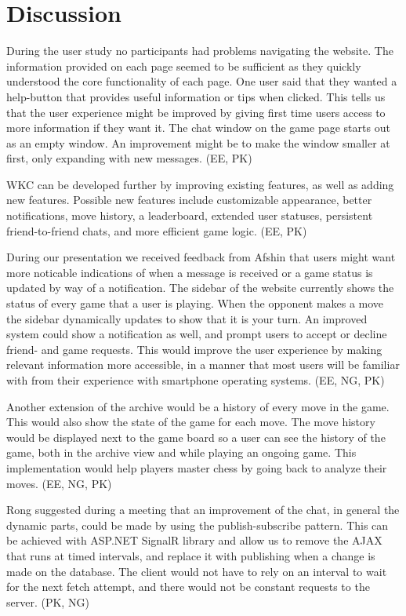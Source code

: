 \documentclass[acmlarge, review=false, screen=true]{acmart}
\begin{document}
\section{Discussion}
  During the user study no participants had problems navigating the website. The information provided on each page seemed to be sufficient as they quickly understood the core functionality of each page. One user said that they wanted a help-button that provides useful information or tips when clicked. This tells us that the user experience might be improved by giving first time users access to more information if they want it. The chat window on the game page starts out as an empty window. An improvement might be to make the window smaller at first, only expanding with new messages. (EE, PK)

  WKC can be developed further by improving existing features, as well as adding new features. Possible new features include customizable appearance, better notifications, move history, a leaderboard, extended user statuses, persistent friend-to-friend chats, and more efficient game logic. (EE, PK)

  During our presentation we received feedback from Afshin that users might want more noticable indications of when a message is received or a game status is updated by way of a notification. The sidebar of the website currently shows the status of every game that a user is playing. When the opponent makes a move the sidebar dynamically updates to show that it is your turn. An improved system could show a notification as well, and prompt users to accept or decline friend- and game requests. This would improve the user experience by making relevant information more accessible, in a manner that most users will be familiar with from their experience with smartphone operating systems. (EE, NG, PK)

  Another extension of the archive would be a history of every move in the game. This would also show the state of the game for each move. The move history would be displayed next to the game board so a user can see the history of the game, both in the archive view and while playing an ongoing game. This implementation would help players master chess by going back to analyze their moves. (EE, NG, PK)

  Rong suggested during a meeting that an improvement of the chat, in general the dynamic parts, could be made by using the publish-subscribe pattern. This can be achieved with ASP.NET SignalR library and allow us to remove the AJAX that runs at timed intervals, and replace it with publishing when a change is made on the database\cite{signalr}. The client would not have to rely on an interval to wait for the next fetch attempt, and there would not be constant requests to the server. (PK, NG)
\end{document}
